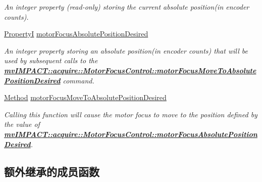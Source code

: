 \begin{DoxyCompactItemize}
\begin{DoxyCompactList}\small\item\em An integer property {\bfseries }(read-\/only) storing the current absolute position(in encoder counts). \end{DoxyCompactList}\item 
\hypertarget{classmv_i_m_p_a_c_t_1_1acquire_1_1_motor_focus_control_ae7aae69dc4b7f21dc301c8074d2da0c4}{\hyperlink{group___common_interface_ga12d5e434238ca242a1ba4c6c3ea45780}{Property\+I} \hyperlink{classmv_i_m_p_a_c_t_1_1acquire_1_1_motor_focus_control_ae7aae69dc4b7f21dc301c8074d2da0c4}{motor\+Focus\+Absolute\+Position\+Desired}}\label{classmv_i_m_p_a_c_t_1_1acquire_1_1_motor_focus_control_ae7aae69dc4b7f21dc301c8074d2da0c4}

\begin{DoxyCompactList}\small\item\em An integer property storing an absolute position(in encoder counts) that will be used by subsequent calls to the {\bfseries \hyperlink{classmv_i_m_p_a_c_t_1_1acquire_1_1_motor_focus_control_a8c8d021c70aae020904a1cf3324ab6de}{mv\+I\+M\+P\+A\+C\+T\+::acquire\+::\+Motor\+Focus\+Control\+::motor\+Focus\+Move\+To\+Absolute\+Position\+Desired}} command. \end{DoxyCompactList}\item 
\hypertarget{classmv_i_m_p_a_c_t_1_1acquire_1_1_motor_focus_control_a8c8d021c70aae020904a1cf3324ab6de}{\hyperlink{classmv_i_m_p_a_c_t_1_1acquire_1_1_method}{Method} \hyperlink{classmv_i_m_p_a_c_t_1_1acquire_1_1_motor_focus_control_a8c8d021c70aae020904a1cf3324ab6de}{motor\+Focus\+Move\+To\+Absolute\+Position\+Desired}}\label{classmv_i_m_p_a_c_t_1_1acquire_1_1_motor_focus_control_a8c8d021c70aae020904a1cf3324ab6de}

\begin{DoxyCompactList}\small\item\em Calling this function will cause the motor focus to move to the position defined by the value of {\bfseries \hyperlink{classmv_i_m_p_a_c_t_1_1acquire_1_1_motor_focus_control_ae7aae69dc4b7f21dc301c8074d2da0c4}{mv\+I\+M\+P\+A\+C\+T\+::acquire\+::\+Motor\+Focus\+Control\+::motor\+Focus\+Absolute\+Position\+Desired}}. \end{DoxyCompactList}\end{DoxyCompactItemize}
\subsection*{额外继承的成员函数}


